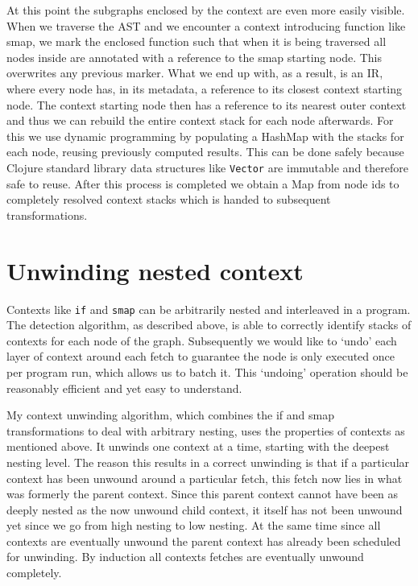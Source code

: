 At this point the subgraphs enclosed by the context are even more easily visible.
When we traverse the AST and we encounter a context introducing function like smap, we mark the enclosed function such that when it is being traversed all nodes inside are annotated with a reference to the smap starting node.
This overwrites any previous marker.
What we end up with, as a result, is an IR, where every node has, in its metadata, a reference to its closest context starting node.
The context starting node then has a reference to its nearest outer context and thus we can rebuild the entire context stack for each node afterwards.
For this we use dynamic programming by populating a HashMap with the stacks for each node, reusing previously computed results.
This can be done safely because Clojure standard library data structures like \texttt{Vector} are immutable and therefore safe to reuse.
After this process is completed we obtain a Map from node ids to completely resolved context stacks which is handed to subsequent transformations.

\section{Unwinding nested context}

Contexts like \texttt{if} and \texttt{smap} can be arbitrarily nested and interleaved in a program.
The detection algorithm, as described above, is able to correctly identify stacks of contexts for each node of the graph.
Subsequently we would like to `undo' each layer of context around each fetch to guarantee the node is only executed once per program run, which allows us to batch it.
This `undoing' operation should be reasonably efficient and yet easy to understand.

My context unwinding algorithm, which combines the if and smap transformations to deal with arbitrary nesting, uses the properties of contexts as mentioned above.
It unwinds one context at a time, starting with the deepest nesting level.
The reason this results in a correct unwinding is that if a particular context has been unwound around a particular fetch, this fetch now lies in what was formerly the parent context.
Since this parent context cannot have been as deeply nested as the now unwound child context, it itself has not been unwound yet since we go from high nesting to low nesting.
At the same time since all contexts are eventually unwound the parent context has already been scheduled for unwinding.
By induction all contexts fetches are eventually unwound completely.


